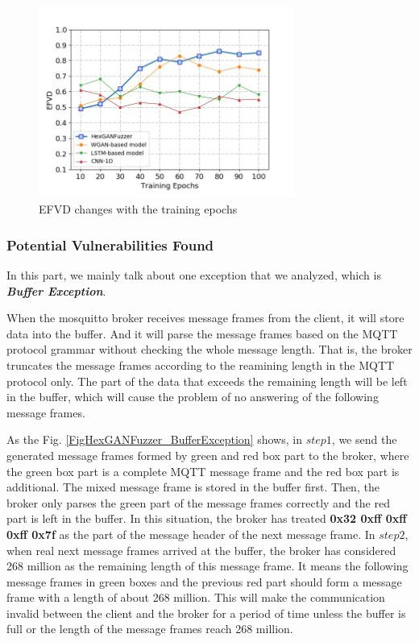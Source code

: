 \begin{figure}[t]
	\centering
	\includegraphics[width=3.3in]{FIGURE_EFVD.jpg}
	\caption{EFVD changes with the training epochs}
	\label{FIGURE_EFVD}
\end{figure}

\subsubsection{Potential Vulnerabilities Found}
In this part, we mainly talk about one exception that we analyzed, which is \textit{\textbf{Buffer Exception}}.

When the mosquitto broker receives message frames from the client, it will store data into the buffer. And it will parse the message frames based on the MQTT protocol grammar without checking the whole message length. That is, the broker truncates the message frames according to the reamining length in the MQTT protocol only. The part of the data that exceeds the remaining length will be left in the buffer, which will cause the problem of no answering of the following message frames.

As the Fig. \ref{FigHexGANFuzzer_BufferException} shows, in $step1$, we send the generated message frames formed by green and red box part to the broker, where the green box part is a complete MQTT message frame and the red box part is additional. The mixed message frame is stored in the buffer first. Then, the broker only parses the green part of the message frames correctly and the red part is left in the buffer. In this situation, the broker has treated \textbf{0x32 0xff 0xff 0xff 0x7f} as the part of the message header of the next message frame. In $step2$, when real next message frames arrived at the buffer, the broker has considered 268 million as the remaining length of this message frame. It means the following message frames in green boxes and the previous red part should form a message frame with a length of about 268 million. This will make the communication invalid between the client and the broker for a period of time unless the buffer is full or the length of the message frames reach 268 million.

